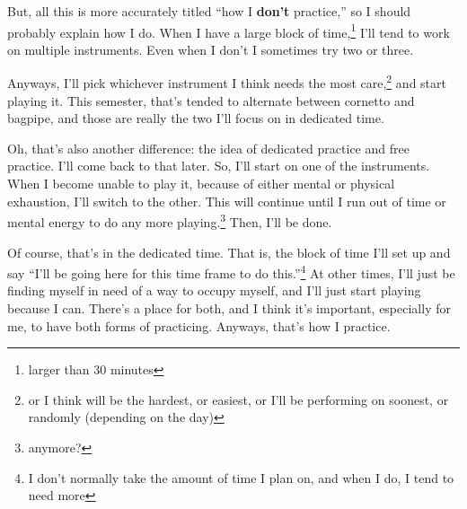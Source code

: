 \documentclass[12pt]{article}[titlepage]
\newcommand{\say}[1]{``#1''}
\newcommand{\1}{\={a}}
\newcommand{\2}{\={e}}
\newcommand{\3}{\={\i}}
\newcommand{\4}{\=o}
\newcommand{\5}{\=u}
\newcommand{\6}{\={A}}
\renewcommand{\,}{\textsuperscript{,}}
\begin{document}
But, all this is more accurately titled \say{how I \textbf{don't} practice,} so I should probably explain how I do.
When I have a large block of time,\footnote{larger than 30 minutes} I'll tend to work on multiple instruments.
Even when I don't I sometimes try two or three.

Anyways, I'll pick whichever instrument I think needs the most care,\footnote{or I think will be the hardest, or easiest, or I'll be performing on soonest, or randomly (depending on the day)} and start playing it.
This semester, that's tended to alternate between cornetto and bagpipe, and those are really the two I'll focus on in dedicated time.

Oh, that's also another difference: the idea of dedicated practice and free practice.
I'll come back to that later.
So, I'll start on one of the instruments.
When I become unable to play it, because of either mental or physical exhaustion, I'll switch to the other.
This will continue until I run out of time or mental energy to do any more playing.\footnote{anymore?}
Then, I'll be done.

Of course, that's in the dedicated time.
That is, the block of time I'll set up and say \say{I'll be going here for this time frame to do this.}\footnote{I don't normally take the amount of time I plan on, and when I do, I tend to need more}
At other times, I'll just be finding myself in need of a way to occupy myself, and I'll just start playing because I can.
There's a place for both, and I think it's important, especially for me, to have both forms of practicing.
Anyways, that's how I practice.
\end{document}
